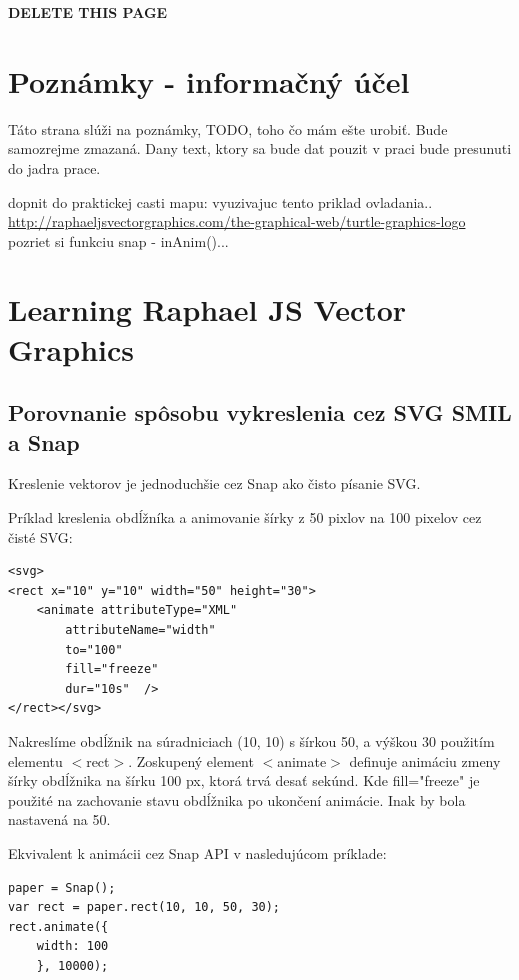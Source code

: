 {\Huge\textbf{ DELETE THIS PAGE}}
\section{Poznámky - informačný účel}
Táto strana slúži na poznámky, TODO, toho čo mám ešte urobiť. 
Bude samozrejme zmazaná.  
Dany text, ktory sa bude dat pouzit v praci bude presunuti do jadra prace. 

dopnit do praktickej casti mapu: vyuzivajuc tento priklad ovladania.. \url{http://raphaeljsvectorgraphics.com/the-graphical-web/turtle-graphics-logo}
pozriet si funkciu snap - inAnim()...

\newpage
\section{Learning Raphael JS Vector Graphics}


\subsection{Porovnanie spôsobu vykreslenia cez SVG SMIL a Snap}

Kreslenie vektorov je jednoduchšie cez Snap ako čisto písanie SVG. 

Príklad kreslenia obdĺžníka a animovanie šírky z 50 pixlov na 100 pixelov cez čisté SVG:\cite[p.~9]{Dawber}
\begin{lstlisting}
<svg>
<rect x="10" y="10" width="50" height="30">
	<animate attributeType="XML"
		attributeName="width"
		to="100"
		fill="freeze"
		dur="10s"  />
</rect></svg>
\end{lstlisting}

Nakreslíme obdĺžnik na súradniciach (10, 10) s šírkou 50, a výškou 30 použitím elementu $<$rect$>$. Zoskupený element $<$animate$>$ definuje animáciu zmeny šírky obdĺžnika na šírku 100 px, ktorá trvá desať sekúnd. Kde fill="freeze" je použité na zachovanie stavu obdĺžnika po ukončení animácie. Inak by bola nastavená na 50. 

Ekvivalent k animácii cez Snap API v nasledujúcom príklade:

\begin{lstlisting}
paper = Snap();
var rect = paper.rect(10, 10, 50, 30);
rect.animate({
	width: 100
	}, 10000);
\end{lstlisting}

